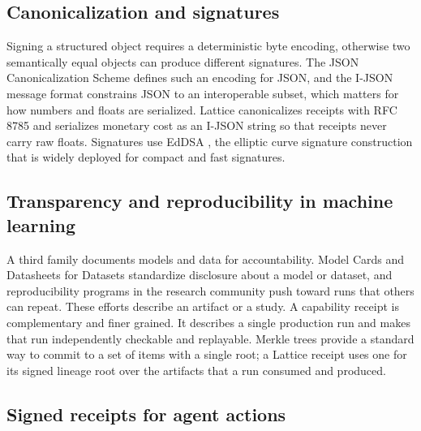 \documentclass[conference]{IEEEtran}
\begin{document}
\subsection{Canonicalization and signatures}

Signing a structured object requires a deterministic byte encoding, otherwise two
semantically equal objects can produce different signatures. The JSON Canonicalization
Scheme \cite{rfc8785} defines such an encoding for JSON, and the I-JSON message format
\cite{rfc7493} constrains JSON to an interoperable subset, which matters for how
numbers and floats are serialized. Lattice canonicalizes receipts with RFC 8785 and
serializes monetary cost as an I-JSON string so that receipts never carry raw floats.
Signatures use EdDSA \cite{rfc8032}, the elliptic curve signature construction that is
widely deployed for compact and fast signatures.

\subsection{Transparency and reproducibility in machine learning}

A third family documents models and data for accountability. Model Cards
\cite{modelcards} and Datasheets for Datasets \cite{datasheets} standardize
disclosure about a model or dataset, and reproducibility programs in the research
community \cite{reproml} push toward runs that others can repeat. These efforts
describe an artifact or a study. A capability receipt is complementary and finer
grained. It describes a single production run and makes that run independently
checkable and replayable. Merkle trees \cite{merkle} provide a standard way to commit
to a set of items with a single root; a Lattice receipt uses one for its signed lineage
root over the artifacts that a run consumed and produced.

\subsection{Signed receipts for agent actions}
\end{document}
